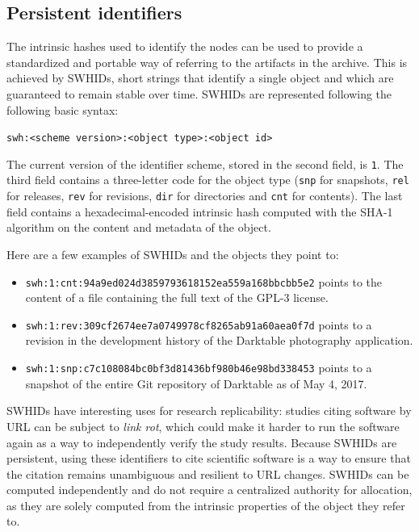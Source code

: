 \subsection{Persistent identifiers}

The intrinsic hashes used to identify the nodes can be used to provide a
standardized and portable way of referring to the artifacts in the archive. This
is achieved by \glspl{SWHID}, short strings that identify a single object
and which are guaranteed to remain stable over time.
\glspl{SWHID} are represented following the following basic syntax:

\texttt{swh:<scheme version>:<object type>:<object id>}

The current version of the identifier scheme, stored in the second field, is
\texttt{1}. The third field contains a three-letter code for the object type
(\texttt{snp} for snapshots, \texttt{rel} for releases, \texttt{rev} for
revisions, \texttt{dir} for directories and \texttt{cnt} for contents). The
last field contains a hexadecimal-encoded intrinsic hash computed with the
SHA-1 algorithm on the content and metadata of the object.

Here are a few examples of \glspl{SWHID} and the objects they point to:

\begin{itemize}
    \setlength\itemsep{0em}
    \item \texttt{swh:1:cnt:94a9ed024d3859793618152ea559a168bbcbb5e2} points to
        the content of a file containing the full text of the GPL-3 license.
    \item \texttt{swh:1:rev:309cf2674ee7a0749978cf8265ab91a60aea0f7d} points to
        a revision in the development history of the Darktable photography
        application.
    \item \texttt{swh:1:snp:c7c108084bc0bf3d81436bf980b46e98bd338453} points to
        a snapshot of the entire Git repository of Darktable as of May 4, 2017.
\end{itemize}

\glspl{SWHID} have interesting uses for research replicability: studies
citing software by URL can be subject to \emph{link rot}, which could make it
harder to run the software again as a way to independently verify the study
results. Because \glspl{SWHID} are persistent, using these identifiers to cite
scientific software is a way to ensure that the citation remains unambiguous
and resilient to URL changes. \glspl{SWHID} can be computed independently and
do not require a centralized authority for allocation, as they are solely
computed from the intrinsic properties of the object they refer to.

